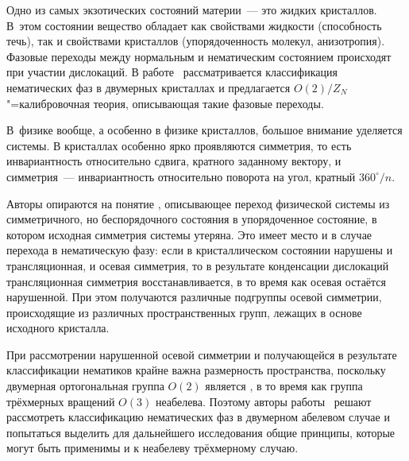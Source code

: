 \documentclass[a4paper, 14pt, titlepage]{extarticle}
\begin{document}
  Одно из самых экзотических состояний материи~--- это  жидких кристаллов.
  В~этом состоянии вещество обладает как свойствами жидкости (способность течь), так и свойствами
  кристаллов (упорядоченность молекул, анизотропия). Фазовые переходы между нормальным и
  нематическим состоянием происходят при участии дислокаций. В работе~\cite{liu-nematic}
  рассматривается классификация нематических фаз в двумерных кристаллах и предлагается
  $O(2)/Z_N$"=калибровочная теория, описывающая такие фазовые переходы.

  В~физике вообще, а особенно в физике кристаллов, большое внимание уделяется 
  системы. В кристаллах особенно ярко проявляются  симметрия, то есть
  инвариантность относительно сдвига, кратного заданному вектору, и  симметрия~---
  инвариантность относительно поворота на угол, кратный $360^\circ/n$.

  Авторы опираются на понятие , описывающее переход физической
  системы из симметричного, но беспорядочного состояния в упорядоченное состояние, в котором
  исходная симметрия системы утеряна. Это имеет место и в случае перехода в нематическую фазу: если
  в кристаллическом состоянии нарушены и трансляционная, и осевая симметрия, то в результате
  конденсации дислокаций трансляционная симметрия восстанавливается, в то время как осевая остаётся
  нарушенной. При этом получаются различные подгруппы осевой симметрии, происходящие из различных
  пространственных групп, лежащих в основе исходного кристалла.

  При рассмотрении нарушенной осевой симметрии и получающейся в результате классификации нематиков
  крайне важна размерность пространства, поскольку двумерная ортогональная группа $O(2)$ является
  , в то время как группа трёхмерных вращений $O(3)$ неабелева. Поэтому авторы
  работы~\cite{liu-nematic} решают рассмотреть классификацию нематических фаз в двумерном абелевом
  случае и попытаться выделить для дальнейшего исследования общие принципы, которые могут быть
  применимы и к неабелеву трёхмерному случаю.
\end{document}

